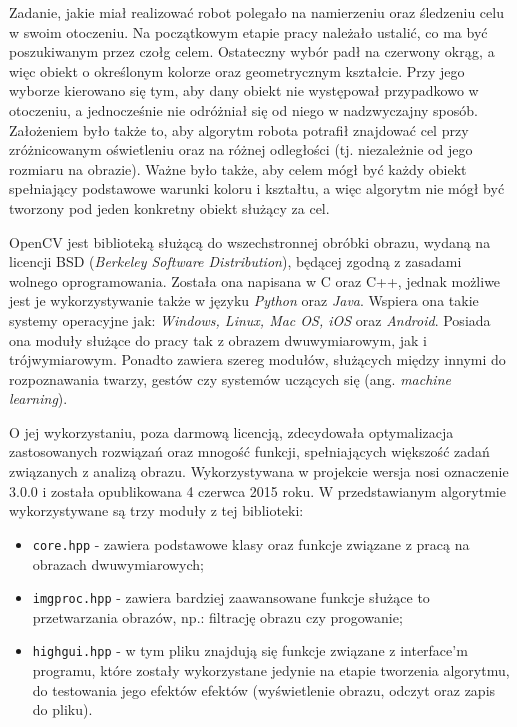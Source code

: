 Zadanie, jakie miał realizować robot polegało na namierzeniu oraz śledzeniu celu w swoim otoczeniu. Na początkowym etapie pracy należało ustalić, co ma być poszukiwanym przez czołg celem. Ostateczny wybór padł na czerwony okrąg, a więc obiekt o określonym kolorze oraz geometrycznym kształcie. Przy jego wyborze kierowano się tym, aby dany obiekt nie występował przypadkowo w otoczeniu, a jednocześnie nie odróżniał się od niego w nadzwyczajny sposób. Założeniem było także to, aby algorytm robota potrafił znajdować cel przy zróżnicowanym oświetleniu oraz na różnej odległości (tj. niezależnie od jego rozmiaru na obrazie). Ważne było także, aby celem mógł być każdy obiekt spełniający podstawowe warunki koloru i kształtu, a więc algorytm nie mógł być tworzony pod jeden konkretny obiekt służący za cel.

OpenCV jest biblioteką służącą do wszechstronnej obróbki obrazu, wydaną na licencji BSD (\textit{Berkeley Software Distribution}), będącej zgodną z zasadami wolnego oprogramowania. Została ona napisana w C oraz C++, jednak możliwe jest je wykorzystywanie także w języku \textit{Python} oraz \textit{Java}. Wspiera ona takie systemy operacyjne jak: \textit{Windows, Linux, Mac OS, iOS} oraz \textit{Android}. Posiada ona moduły służące do pracy tak z obrazem dwuwymiarowym, jak i trójwymiarowym. Ponadto zawiera szereg modułów, służących między innymi do rozpoznawania twarzy, gestów czy systemów uczących się (ang. \textit{machine learning}).

O jej wykorzystaniu, poza darmową licencją, zdecydowała optymalizacja zastosowanych rozwiązań oraz mnogość funkcji, spełniających większość zadań związanych z analizą obrazu. Wykorzystywana w projekcie wersja nosi oznaczenie 3.0.0 i została opublikowana 4 czerwca 2015 roku. W przedstawianym algorytmie wykorzystywane są trzy moduły z tej biblioteki:
\begin{itemize}
\item \texttt{core.hpp} - zawiera podstawowe klasy oraz funkcje związane z pracą na obrazach dwuwymiarowych;
\item \texttt{imgproc.hpp} - zawiera bardziej zaawansowane funkcje służące to przetwarzania obrazów, np.: filtrację obrazu czy progowanie;
\item \texttt{highgui.hpp} - w tym pliku znajdują się funkcje związane z interface'm programu, które zostały wykorzystane jedynie na etapie tworzenia algorytmu, do testowania jego efektów efektów (wyświetlenie obrazu, odczyt oraz zapis do pliku).
\end{itemize}

